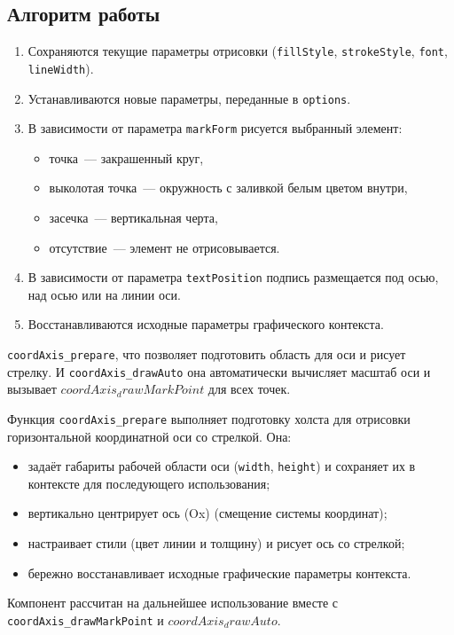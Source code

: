 \subsection{Алгоритм работы}
\begin{enumerate}
    \item Сохраняются текущие параметры отрисовки (\texttt{fillStyle}, \texttt{strokeStyle}, \texttt{font}, \texttt{lineWidth}).
    \item Устанавливаются новые параметры, переданные в \texttt{options}.
    \item В зависимости от параметра \texttt{markForm} рисуется выбранный элемент:
    \begin{itemize}
        \item точка~--- закрашенный круг,
        \item выколотая точка~--- окружность с заливкой белым цветом внутри,
        \item засечка~--- вертикальная черта,
        \item отсутствие~--- элемент не отрисовывается.
    \end{itemize}
    \item В зависимости от параметра \texttt{textPosition} подпись размещается под осью, над осью или на линии оси.
    \item Восстанавливаются исходные параметры графического контекста.
\end{enumerate}

 \texttt{coordAxis\_prepare}, что позволяет подготовить область для оси и рисует стрелку. И
\texttt{coordAxis\_drawAuto} она автоматически вычисляет масштаб оси и вызывает $coordAxis_drawMarkPoint$ для всех точек.


Функция \texttt{coordAxis\_prepare} выполняет подготовку холста для отрисовки горизонтальной координатной оси со стрелкой.
Она:
\begin{itemize}
  \item задаёт габариты рабочей области оси (\verb|width|, \verb|height|) и сохраняет их в контексте для последующего использования;
  \item вертикально центрирует ось (Ox) (смещение системы координат);
  \item настраивает стили (цвет линии и толщину) и рисует ось со стрелкой;
  \item бережно восстанавливает исходные графические параметры контекста.
\end{itemize}
Компонент рассчитан на дальнейшее использование вместе с \texttt{coordAxis\_drawMarkPoint} и $coordAxis_drawAuto$.

